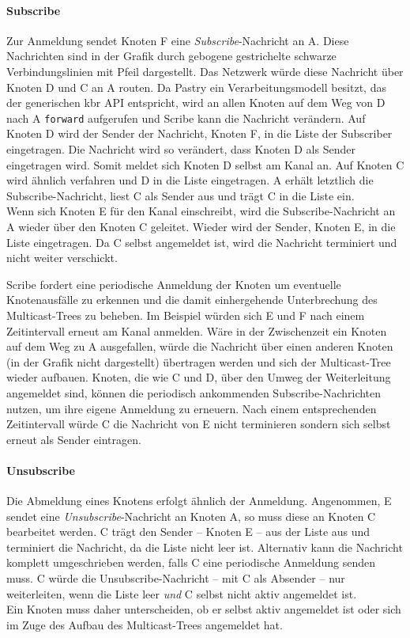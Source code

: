 \paragraph{Subscribe}
Zur Anmeldung sendet Knoten F eine \emph{Subscribe}-Nachricht an A. Diese Nachrichten sind in der Grafik durch gebogene gestrichelte schwarze Verbindungslinien mit Pfeil dargestellt. Das Netzwerk würde diese Nachricht über Knoten D und C an A routen. Da Pastry ein Verarbeitungsmodell besitzt, das der generischen \ac{kbr} API entspricht, wird an allen Knoten auf dem Weg von D nach A \texttt{forward} aufgerufen und Scribe kann die Nachricht verändern. Auf Knoten D wird der Sender der Nachricht, Knoten F, in die Liste der Subscriber eingetragen. Die Nachricht wird so verändert, dass Knoten D als Sender eingetragen wird. Somit meldet sich Knoten D selbst am Kanal an. Auf Knoten C wird ähnlich verfahren und D in die Liste eingetragen. A erhält letztlich die Subscribe-Nachricht, liest C als Sender aus und trägt C in die Liste ein.\\
Wenn sich Knoten E für den Kanal einschreibt, wird die Subscribe-Nachricht an A wieder über den Knoten C geleitet. Wieder wird der Sender, Knoten E, in die Liste eingetragen. Da C selbst angemeldet ist, wird die Nachricht terminiert und nicht weiter verschickt.

Scribe fordert eine periodische Anmeldung der Knoten um eventuelle Knotenausfälle zu erkennen und die damit einhergehende Unterbrechung des Multicast-Trees zu beheben. Im Beispiel würden sich E und F nach einem Zeitintervall erneut am Kanal anmelden. Wäre in der Zwischenzeit ein Knoten auf dem Weg zu A ausgefallen, würde die Nachricht über einen anderen Knoten (in der Grafik nicht dargestellt) übertragen werden und sich der Multicast-Tree wieder aufbauen. Knoten, die wie C und D, über den Umweg der Weiterleitung angemeldet sind, können die periodisch ankommenden Subscribe-Nachrichten nutzen, um ihre eigene Anmeldung zu erneuern. Nach einem entsprechenden Zeitintervall würde C die Nachricht von E nicht terminieren sondern sich selbst erneut als Sender eintragen.

\paragraph{Unsubscribe}
Die Abmeldung eines Knotens erfolgt ähnlich der Anmeldung. Angenommen, E sendet eine \emph{Unsubscribe}-Nachricht an Knoten A, so muss diese an Knoten C bearbeitet werden. C trägt den Sender -- Knoten E -- aus der Liste aus und terminiert die Nachricht, da die Liste nicht leer ist. Alternativ kann die Nachricht komplett umgeschrieben werden, falls C eine periodische Anmeldung senden muss. C würde die Unsubscribe-Nachricht -- mit C als Absender -- nur weiterleiten, wenn die Liste leer \emph{und} C selbst nicht aktiv angemeldet ist.\\
Ein Knoten muss daher unterscheiden, ob er selbst aktiv angemeldet ist oder sich im Zuge des Aufbau des Multicast-Trees angemeldet hat.

